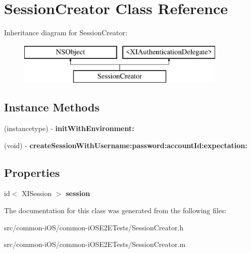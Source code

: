 \hypertarget{interface_session_creator}{}\section{Session\+Creator Class Reference}
\label{interface_session_creator}
Inheritance diagram for Session\+Creator\+:\begin{figure}[H]
\begin{center}
\leavevmode
\includegraphics[height=2.000000cm]{interface_session_creator}
\end{center}
\end{figure}
\subsection*{Instance Methods}
\begin{DoxyCompactItemize}
\item 
\hypertarget{interface_session_creator_a53c4a9d59a0e38c81cc08eae3bee8863}{}\label{interface_session_creator_a53c4a9d59a0e38c81cc08eae3bee8863} 
(instancetype) -\/ {\bfseries init\+With\+Environment\+:}
\item 
\hypertarget{interface_session_creator_abf4bbb716e76d245e45254e51fce8b14}{}\label{interface_session_creator_abf4bbb716e76d245e45254e51fce8b14} 
(void) -\/ {\bfseries create\+Session\+With\+Username\+:password\+:account\+Id\+:expectation\+:}
\end{DoxyCompactItemize}
\subsection*{Properties}
\begin{DoxyCompactItemize}
\item 
\hypertarget{interface_session_creator_a1e6c8a3b2869418349a0b0997cd9f79e}{}\label{interface_session_creator_a1e6c8a3b2869418349a0b0997cd9f79e} 
id$<$ X\+I\+Session $>$ {\bfseries session}
\end{DoxyCompactItemize}


The documentation for this class was generated from the following files\+:\begin{DoxyCompactItemize}
\item 
src/common-\/i\+O\+S/common-\/i\+O\+S\+E2\+E\+Tests/Session\+Creator.\+h\item 
src/common-\/i\+O\+S/common-\/i\+O\+S\+E2\+E\+Tests/Session\+Creator.\+m\end{DoxyCompactItemize}
